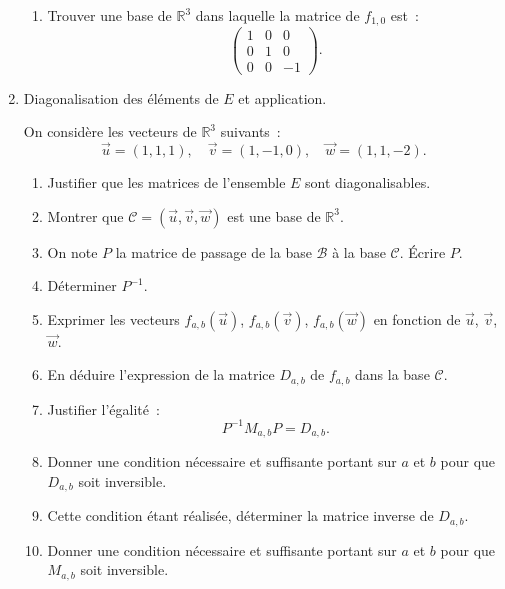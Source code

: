 \begin{exercice}
\begin{enumerate}
\begin{enumerate}
\item Trouver une base de $\mathbb{R}^{3}$ dans laquelle la matrice de $%
f_{1,0}$ est~: 
\begin{equation*}
\left( 
\begin{array}{ccc}
1 & 0 & 0 \\ 
0 & 1 & 0 \\ 
0 & 0 & -1%
\end{array}
\right) .
\end{equation*}
\end{enumerate}

\item Diagonalisation des \'{e}l\'{e}ments de $E$ et application.

On consid\`ere les vecteurs de $\mathbb{R}^3$ suivants~: 
\begin{equation*}
\vec{u}=(1,1,1), \quad \vec{v}=(1,-1,0), \quad \vec{w}=(1,1,-2).
\end{equation*}

\begin{enumerate}
\item Justifier que les matrices de l'ensemble $E$ sont diagonalisables.

\item Montrer que $\mathcal{C}=\left( \vec{u},\vec{v},\vec{w}\right) $ est
une base de $\mathbb{R}^{3}$.

\item On note $P$ la matrice de passage de la base $\mathcal{B}$ \`{a} la
base $\mathcal{C}$. \'{E}crire $P$.

\item D\'{e}terminer $P^{-1}$.

\item Exprimer les vecteurs $f_{a,b}\left( \vec{u}\right) $, $f_{a,b}\left( 
\vec{v}\right) $, $f_{a,b}\left( \vec{w}\right) $ en fonction de $\vec{u}$, $%
\vec{v}$, $\vec{w}$.

\item En d\'{e}duire l'expression de la matrice $D_{a,b}$ de $f_{a,b}$ dans
la base $\mathcal{C}$.

\item Justifier l'\'{e}galit\'{e}~: 
\begin{equation*}
P^{-1}M_{a,b}P=D_{a,b}.
\end{equation*}

\item Donner une condition n\'{e}cessaire et suffisante portant sur $a$ et $%
b $ pour que $D_{a,b}$ soit inversible.

\item Cette condition \'{e}tant r\'{e}alis\'{e}e, d\'{e}terminer la matrice
inverse de $D_{a,b}$.

\item Donner une condition n\'{e}cessaire et suffisante portant sur $a$ et $%
b $ pour que $M_{a,b}$ soit inversible.
\end{enumerate}

\end{enumerate}

\end{exercice}





